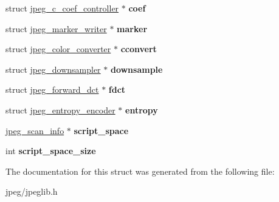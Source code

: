 \begin{DoxyCompactItemize}
\item 
struct \hyperlink{structjpeg__c__coef__controller}{jpeg\+\_\+c\+\_\+coef\+\_\+controller} $\ast$ {\bfseries coef}\hypertarget{structjpeg__compress__struct_ad54865b66c30ce332c6757d56393dedc}{}\label{structjpeg__compress__struct_ad54865b66c30ce332c6757d56393dedc}

\item 
struct \hyperlink{structjpeg__marker__writer}{jpeg\+\_\+marker\+\_\+writer} $\ast$ {\bfseries marker}\hypertarget{structjpeg__compress__struct_a909e4ca5c3c48f380a53cc1b068eea12}{}\label{structjpeg__compress__struct_a909e4ca5c3c48f380a53cc1b068eea12}

\item 
struct \hyperlink{structjpeg__color__converter}{jpeg\+\_\+color\+\_\+converter} $\ast$ {\bfseries cconvert}\hypertarget{structjpeg__compress__struct_a7c51e665f18d6e5a0fed053c470f4914}{}\label{structjpeg__compress__struct_a7c51e665f18d6e5a0fed053c470f4914}

\item 
struct \hyperlink{structjpeg__downsampler}{jpeg\+\_\+downsampler} $\ast$ {\bfseries downsample}\hypertarget{structjpeg__compress__struct_a65a72b804640a0c339863f6562098113}{}\label{structjpeg__compress__struct_a65a72b804640a0c339863f6562098113}

\item 
struct \hyperlink{structjpeg__forward__dct}{jpeg\+\_\+forward\+\_\+dct} $\ast$ {\bfseries fdct}\hypertarget{structjpeg__compress__struct_ac113c777486860f0b2f3784345073a83}{}\label{structjpeg__compress__struct_ac113c777486860f0b2f3784345073a83}

\item 
struct \hyperlink{structjpeg__entropy__encoder}{jpeg\+\_\+entropy\+\_\+encoder} $\ast$ {\bfseries entropy}\hypertarget{structjpeg__compress__struct_a30477f9e5f6be16823e1aff2762ae270}{}\label{structjpeg__compress__struct_a30477f9e5f6be16823e1aff2762ae270}

\item 
\hyperlink{structjpeg__scan__info}{jpeg\+\_\+scan\+\_\+info} $\ast$ {\bfseries script\+\_\+space}\hypertarget{structjpeg__compress__struct_ab4a2c220ed2cda1b0d4c88518d02a229}{}\label{structjpeg__compress__struct_ab4a2c220ed2cda1b0d4c88518d02a229}

\item 
int {\bfseries script\+\_\+space\+\_\+size}\hypertarget{structjpeg__compress__struct_ae50a683b4baddef6571900ca6240b1a3}{}\label{structjpeg__compress__struct_ae50a683b4baddef6571900ca6240b1a3}

\end{DoxyCompactItemize}


The documentation for this struct was generated from the following file\+:\begin{DoxyCompactItemize}
\item 
jpeg/jpeglib.\+h\end{DoxyCompactItemize}
